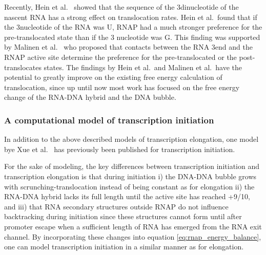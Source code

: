 Recently, Hein et al.\ \cite{hein_rna_2011} showed that the sequence of the
3\ppp dinucleotide of the nascent RNA has a strong effect on translocation
rates.  Hein et al.\ found that if the 3\ppp nucleotide of the RNA was U, RNAP
had a much stronger preference for the pre-translocated state than if the 3\ppp
nucleotide was G. This finding was supported by Malinen et al.\
\cite{malinen_active_2012} who proposed that contacts between the RNA 3\ppp end
and the RNAP active site determine the preference for the pre-translocated or
the post-translocates states. The findings by Hein et al.\ and Malinen et al.\
have the potential to greatly improve on the existing free energy calculation of
translocation, since up until now most work has focused on the free energy
change of the RNA-DNA hybrid and the DNA bubble.

\subsubsection{A computational model of transcription initiation}
In addition to the above described models of transcription elongation, one
model bye Xue et al.\ \cite{xue_kinetic_2008} has previously been published for
transcription initiation.

For the sake of modeling, the key differences between transcription initiation
and transcription elongation is that during initiation i) the DNA-DNA
bubble grows with scrunching-translocation instead of being constant as for
elongation ii) the RNA-DNA hybrid lacks its full length until
the active site has reached +9/10, and iii) that RNA secondary structures
outside RNAP do not influence backtracking during initiation since these
structures cannot form until after promoter escape when a sufficient length of
RNA has emerged from the RNA exit channel. By incorporating these changes into
equation \eqref{eq:rnap_energy_balance}, one can model transcription initiation
in a similar manner as for elongation.

